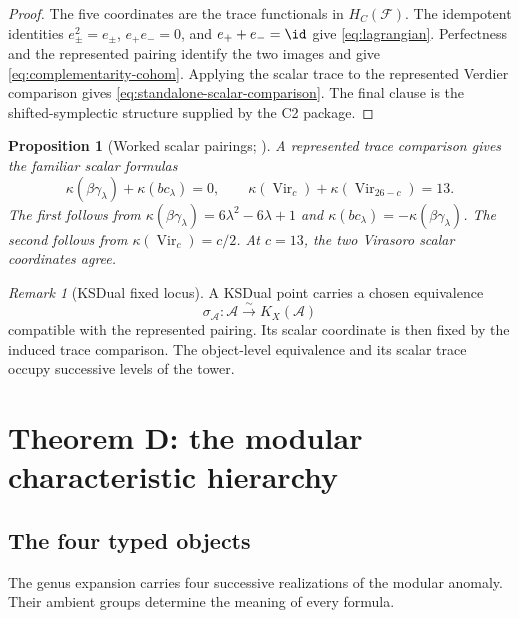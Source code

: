 \documentclass[11pt]{article}
\theoremstyle{plain}
\newtheorem{proposition}[theorem]{Proposition}
\theoremstyle{definition}
\theoremstyle{remark}
\newtheorem{remark}[theorem]{Remark}
\newcommand{\cA}{\mathcal{A}}
\begin{document}
\begin{proof}
The five coordinates are the trace functionals in
\(H_C(\mathcal F)\).  The idempotent identities
\(e_\pm^2=e_\pm\), \(e_+e_-=0\), and \(e_++e_-=\id\)
give \eqref{eq:lagrangian}.  Perfectness and the represented pairing
identify the two images and give
\eqref{eq:complementarity-cohom}.  Applying the scalar trace to the
represented Verdier comparison gives
\eqref{eq:standalone-scalar-comparison}.  The final clause is the
shifted-symplectic structure supplied by the C2 package.
\end{proof}

\begin{proposition}[Worked scalar pairings;
\ClaimStatusConditional]
\label{prop:complementarity-sums}
A represented trace comparison gives the familiar scalar formulas
\[
 \kappa(\beta\gamma_\lambda)
 +\kappa(bc_\lambda)=0,
 \qquad
 \kappa(\operatorname{Vir}_c)
 +\kappa(\operatorname{Vir}_{26-c})=13.
\]
The first follows from
\(\kappa(\beta\gamma_\lambda)=6\lambda^2-6\lambda+1\) and
\(\kappa(bc_\lambda)=-\kappa(\beta\gamma_\lambda)\).
The second follows from
\(\kappa(\operatorname{Vir}_c)=c/2\).
At \(c=13\), the two Virasoro scalar coordinates agree.
\end{proposition}

\begin{remark}[KSDual fixed locus]
A KSDual point carries a chosen equivalence
\[
 \sigma_\cA\colon\cA\xrightarrow{\sim}K_X(\cA)
\]
compatible with the represented pairing.  Its scalar coordinate is
then fixed by the induced trace comparison.  The object-level
equivalence and its scalar trace occupy successive levels of the
tower.
\end{remark}


\section{Theorem D: the modular characteristic hierarchy}
\label{sec:theorem-D}

\subsection{The four typed objects}

The genus expansion carries four successive realizations of the
modular anomaly.  Their ambient groups determine the meaning of every
formula.
\end{document}
